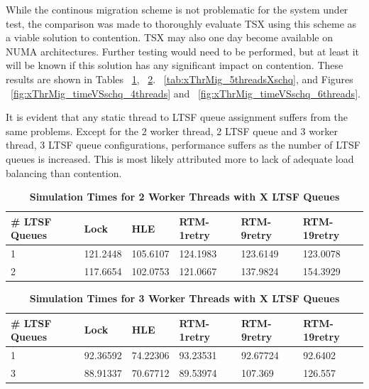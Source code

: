 \documentclass[11pt]{book}
\begin{document}
While the continous migration scheme is not problematic for the system under
test, the comparison was made to thoroughly evaluate TSX using this scheme as a
viable solution to contention.  TSX may also one day become available on NUMA
architectures.  Further testing would need to be performed, but at least it will
be known if this solution has any significant impact on contention.  These
results are shown in Tables ~\ref{tab:xThrMig_2threadsXschq},
~\ref{tab:xThrMig_3threadsXschq}.  ~\ref{tab:xThrMig_5threadsXschq}, and Figures
~\ref{fig:xThrMig_timeVSschq_4threads} and
~\ref{fig:xThrMig_timeVSschq_6threads}.

It is evident that any static thread to LTSF queue assignment suffers from the
same problems.  Except for the 2 worker thread, 2 LTSF queue and 3 worker
thread, 3 LTSF queue configurations, performance suffers as the number of LTSF
queues is increased.  This is most likely attributed more to lack of adequate
load balancing than contention.

\begin{table}[H]
    \centering
    \begin{tabular}{l|p{2cm}|p{2cm}|p{2cm}|p{2cm}|p{2cm}}
        \textbf{\# LTSF Queues}&Lock &HLE &RTM-1retry &RTM-9retry &RTM-19retry \\
        \hline
        \midrule
            1 &121.2448  &105.6107 &124.1983 &123.6149 &123.0078\\ 
            2 &117.6654  &102.0753 &121.0667 &137.9824 &154.3929\\
    \end{tabular}
    \caption{\textbf{Simulation Times for 2 Worker Threads with X LTSF
        Queues}}\label{tab:xThrMig_2threadsXschq} 
\end{table}

\begin{table}[H]
    \centering
    \begin{tabular}{l|p{2cm}|p{2cm}|p{2cm}|p{2cm}|p{2cm}}
        \textbf{\# LTSF Queues}&Lock &HLE &RTM-1retry &RTM-9retry &RTM-19retry \\
        \hline
        \midrule
            1 &92.36592  &74.22306 &93.23531  &92.67724 &92.6402 \\ 
            3 &88.91337  &70.67712 &89.53974  &107.369  &126.557 \\
    \end{tabular}
    \caption{\textbf{Simulation Times for 3 Worker Threads with X LTSF
        Queues}}\label{tab:xThrMig_3threadsXschq} 
\end{table}
\end{document}
